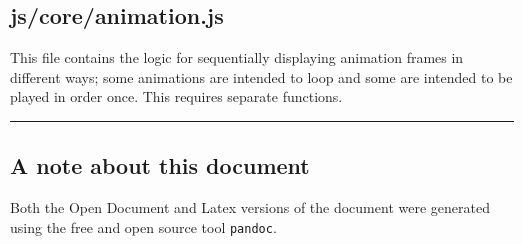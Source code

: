 \documentclass[11pt]{article}
\begin{document}
\subsection{js/core/animation.js}
\label{sec:orge2feee2}
This file contains the logic for sequentially displaying animation frames in different ways; some animations are intended to loop and some are intended to be played in order once. This requires separate functions.\\

\noindent\rule{\textwidth}{0.5pt}
\subsection{A note about this document}
\label{sec:org16f5525}
Both the Open Document and Latex versions of the document were generated using the free and open source tool \texttt{pandoc}.\\
\end{document}
